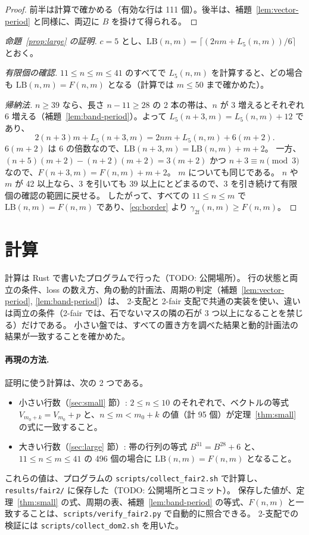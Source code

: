 \documentclass[11pt]{ltjsarticle}
\theoremstyle{definition}
\newcommand{\gf}{\gamma_{2\mathrm{f}}}
\begin{document}
\begin{proof}
前半は計算で確かめる（有効な行は 111 個）。後半は、補題~\ref{lem:vector-period} と同様に、両辺に $B$ を掛けて得られる。
\end{proof}

\begin{proof}[命題~\ref{prop:large} の証明]
$c=5$ とし、$\mathrm{LB}(n,m)=\lceil (2nm+L_5(n,m))/6\rceil$ とおく。

\emph{有限個の確認.} $11\le n\le m\le 41$ のすべてで $L_5(n,m)$ を計算すると、どの場合も $\mathrm{LB}(n,m)=F(n,m)$ となる（計算では $m\le 50$ まで確かめた）。

\emph{帰納法.} $n\ge 39$ なら、長さ $n-11\ge 28$ の 2 本の帯は、$n$ が 3 増えるとそれぞれ 6 増える（補題~\ref{lem:band-period}）。よって $L_5(n+3,m)=L_5(n,m)+12$ であり、
\[
2(n+3)m+L_5(n+3,m)=2nm+L_5(n,m)+6(m+2).
\]
$6(m+2)$ は 6 の倍数なので、$\mathrm{LB}(n+3,m)=\mathrm{LB}(n,m)+m+2$。
一方、$(n+5)(m+2)-(n+2)(m+2)=3(m+2)$ かつ $n+3\equiv n \pmod 3$ なので、$F(n+3,m)=F(n,m)+m+2$。
$m$ についても同じである。
$n$ や $m$ が 42 以上なら、3 を引いても 39 以上にとどまるので、3 を引き続けて有限個の確認の範囲に戻せる。
したがって、すべての $11\le n\le m$ で $\mathrm{LB}(n,m)=F(n,m)$ であり、\eqref{eq:border} より $\gf(n,m)\ge F(n,m)$。
\end{proof}

\section{計算}\label{sec:computation}

計算は Rust で書いたプログラムで行った（TODO: 公開場所）。
行の状態と両立の条件、loss の数え方、角の動的計画法、周期の判定（補題~\ref{lem:vector-period}, \ref{lem:band-period}）は、
2-支配と 2-fair 支配で共通の実装を使い、違いは両立の条件（2-fair では、石でないマスの隣の石が 3 つ以上になることを禁じる）だけである。
小さい盤では、すべての置き方を調べた結果と動的計画法の結果が一致することを確かめた。

\paragraph{再現の方法.}
証明に使う計算は、次の 2 つである。
\begin{itemize}
\item 小さい行数（\ref{sec:small} 節）: $2\le n\le 10$ のそれぞれで、ベクトルの等式 $V_{m_0+k}=V_{m_0}+p$ と、$n\le m<m_0+k$ の値（計 95 個）が定理~\ref{thm:small} の式に一致すること。
\item 大きい行数（\ref{sec:large} 節）: 帯の行列の等式 $B^{31}=B^{28}+6$ と、$11\le n\le m\le 41$ の 496 個の場合に $\mathrm{LB}(n,m)=F(n,m)$ となること。
\end{itemize}
これらの値は、プログラムの \texttt{scripts/collect\_fair2.sh} で計算し、\texttt{results/fair2/} に保存した（TODO: 公開場所とコミット）。
保存した値が、定理~\ref{thm:small} の式、周期の表、補題~\ref{lem:band-period} の等式、$F(n,m)$ と一致することは、\texttt{scripts/verify\_fair2.py} で自動的に照合できる。
2-支配での検証には \texttt{scripts/collect\_dom2.sh} を用いた。
\end{document}

